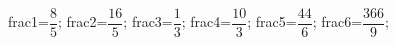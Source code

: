 \documentclass[exercice]{thedocument}%
\begin{document}
%
    \>frac1=$\dfrac85$;%
    \>frac2=$\dfrac{16}5$;%
    \>frac3=$\dfrac13$;%
    \>frac4=$\dfrac{10}3$;%
    \>frac5=$\dfrac{44}6$;%
    \>frac6=$\dfrac{366}9$;%
\end{document}
